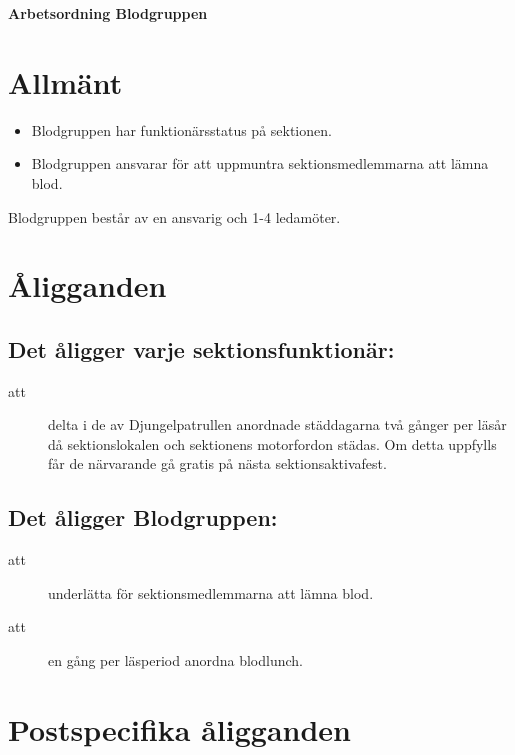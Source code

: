 \renewcommand{\dateseparator}{-} %

\renewcommand{\forening}{Blodgruppen }

\begin{center}
\LARGE{\textbf{Arbetsordning \forening}}
\end{center}


\section{Allmänt}
\begin{itemize}
\item \forening har funktionärsstatus på sektionen.
\item \forening ansvarar för att uppmuntra sektionsmedlemmarna att lämna blod. 
\end{itemize}

Blodgruppen består av en ansvarig och 1-4 ledamöter.

\section{Åligganden}
\subsection{Det åligger varje sektionsfunktionär:}
    \begin{description}
      \item[att] delta i de av Djungelpatrullen anordnade städdagarna två gånger per
      läsår då sektionslokalen och sektionens motorfordon städas. Om detta uppfylls får de närvarande gå gratis på nästa
      sektionsaktivafest.
    \end{description}


\subsection{Det åligger Blodgruppen:}
    \begin{description}
    \item[att] underlätta för sektionsmedlemmarna att lämna blod.
    \item[att] en gång per läsperiod anordna blodlunch. 
    \end{description}

\section{Postspecifika åligganden}

